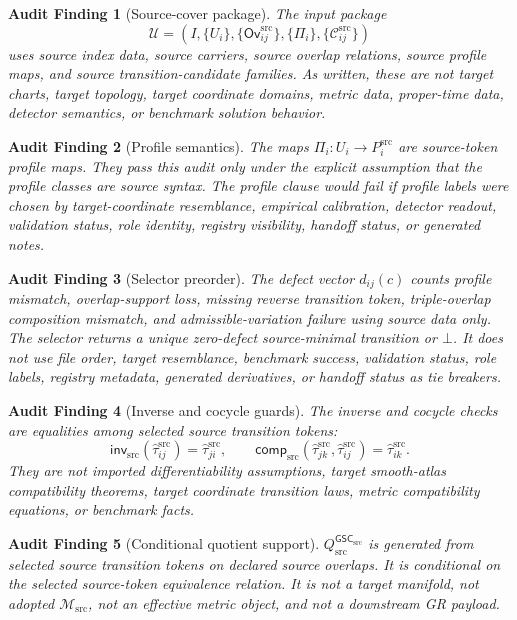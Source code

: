 \documentclass[11pt]{article}
\newcommand{\Msrc}{\mathcal{M}_{\mathrm{src}}}
\newcommand{\GSC}{\mathsf{GSC}_{\mathrm{src}}}
\newcommand{\Ovsrc}{\mathsf{Ov}^{\mathrm{src}}}
\newcommand{\Cand}{\mathcal{C}^{\mathrm{src}}}
\newcommand{\Tau}{\widehat{\tau}^{\mathrm{src}}}
\newcommand{\Qsrc}{Q_{\mathrm{src}}^{\GSC}}
\newcommand{\Bot}{\bot}
\newtheorem{audit}{Audit Finding}
\begin{document}
\begin{audit}[Source-cover package]
The input package
\[
  \mathcal U =
  \left(I,\{U_i\},\{\Ovsrc_{ij}\},\{\Pi_i\},\{\Cand_{ij}\}\right)
\]
uses source index data, source carriers, source overlap relations, source
profile maps, and source transition-candidate families. As written, these are
not target charts, target topology, target coordinate domains, metric data,
proper-time data, detector semantics, or benchmark solution behavior.
\end{audit}

\begin{audit}[Profile semantics]
The maps \(\Pi_i:U_i\to P_i^{\mathrm{src}}\) are source-token profile maps.
They pass this audit only under the explicit assumption that the profile
classes are source syntax. The profile clause would fail if profile labels
were chosen by target-coordinate resemblance, empirical calibration, detector
readout, validation status, role identity, registry visibility, handoff
status, or generated notes.
\end{audit}

\begin{audit}[Selector preorder]
The defect vector \(d_{ij}(c)\) counts profile mismatch, overlap-support loss,
missing reverse transition token, triple-overlap composition mismatch, and
admissible-variation failure using source data only. The selector returns a
unique zero-defect source-minimal transition or \(\Bot\). It does not use file
order, target resemblance, benchmark success, validation status, role labels,
registry metadata, generated derivatives, or handoff status as tie breakers.
\end{audit}

\begin{audit}[Inverse and cocycle guards]
The inverse and cocycle checks are equalities among selected source transition
tokens:
\[
  \mathsf{inv}_{\mathrm{src}}(\Tau_{ij})=\Tau_{ji},\qquad
  \mathsf{comp}_{\mathrm{src}}(\Tau_{jk},\Tau_{ij})=\Tau_{ik}.
\]
They are not imported differentiability assumptions, target smooth-atlas
compatibility theorems, target coordinate transition laws, metric
compatibility equations, or benchmark facts.
\end{audit}

\begin{audit}[Conditional quotient support]
\(\Qsrc\) is generated from selected source transition tokens on declared
source overlaps. It is conditional on the selected source-token equivalence
relation. It is not a target manifold, not adopted \(\Msrc\), not an
effective metric object, and not a downstream GR payload.
\end{audit}
\end{document}
